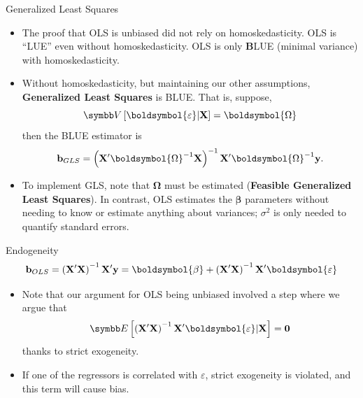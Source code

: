 \documentclass[aspectratio=169,11pt]{beamer}
\begin{document}
\begin{frame}{Generalized Least Squares}
\begin{itemize}
	\item The proof that OLS is unbiased did not rely on homoskedasticity. OLS
	is ``LUE'' even without homoskedasticity. OLS is only {\bf B}LUE (minimal variance) with homoskedasticity.

	\smallskip
	\item Without homoskedasticity, but maintaining our other assumptions, {\bf Generalized
		Least Squares} is BLUE. That is, suppose,\[
	\Var\left[\boldsymbol{\varepsilon} | {\bf X} \right] = \boldsymbol{\Omega}
	\]
	then the BLUE estimator is \[
	{\bf b}_{GLS} = \left({\bf X}'\boldsymbol{\Omega}^{-1}{\bf X}\right)^{-1} {\bf X}' \boldsymbol{\Omega}^{-1}{\bf y} .
	\]
	
	\smallskip
	\item To implement GLS, note that $\boldsymbol{\Omega}$ must be estimated ({\bf Feasible Generalized
		Least Squares}). In contrast, OLS estimates the $\boldsymbol{\beta}$ parameters without needing to know or estimate
		anything about variances; $\sigma^2$ is only needed to quantify standard errors. 
\end{itemize}
\end{frame}



\begin{frame}{Endogeneity}
\[
	{\bf b}_{OLS} = \left({\bf X}'{\bf X}\right)^{-1} {\bf X}' {\bf y} = \boldsymbol{\beta}  + \left({\bf X}'{\bf X}\right)^{-1} {\bf X}' \boldsymbol{\varepsilon}
	\]
\begin{itemize}
		\item Note that our argument for OLS being unbiased involved a step where we argue that \[
	\E\left[\left({\bf X}'{\bf X}\right)^{-1} {\bf X}' \boldsymbol{\varepsilon} | {\bf X}\right] ={\bf 0}
	\]
	thanks to strict exogeneity.

	\medskip
	\item If one of the regressors is correlated with $\varepsilon$, strict exogeneity is violated, and this term will cause bias. 

\end{itemize}
\end{frame}
\end{document}
